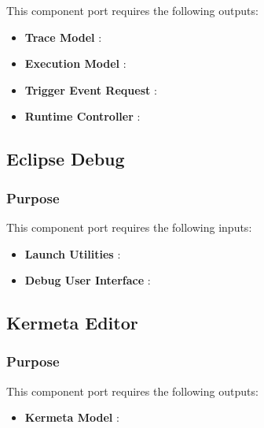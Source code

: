 \documentclass{gemoc} %
\begin{document}
This component port requires the following outputs:
\begin{itemize}
  \item \textbf{Trace Model} :
  \item \textbf{Execution Model} :
  \item \textbf{Trigger Event Request} :
  \item \textbf{Runtime Controller} :
\end{itemize}

\subsection{Eclipse Debug}


\subsubsection{Purpose}

This component port requires the following inputs:
\begin{itemize}
  \item \textbf{Launch Utilities} :
  \item \textbf{Debug User Interface} :
\end{itemize}


\subsection{Kermeta Editor}


\subsubsection{Purpose}


This component port requires the following outputs:
\begin{itemize}
  \item \textbf{Kermeta Model} :
\end{itemize}
\end{document}
